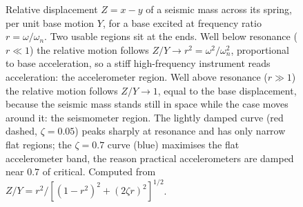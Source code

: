 \begin{figure}[htbp]
\centering
{}
\caption[Seismic-transducer design regions]{Relative displacement
$Z=x-y$ of a seismic mass across its spring, per unit base motion $Y$,
for a base excited at frequency ratio $r=\omega/\omega_n$. Two usable
regions sit at the ends. Well below resonance ($r\ll1$) the relative
motion follows $Z/Y\to r^2=\omega^2/\omega_n^2$, proportional to base
acceleration, so a stiff high-frequency instrument reads acceleration:
the accelerometer region. Well above resonance ($r\gg1$) the relative
motion follows $Z/Y\to1$, equal to the base displacement, because the
seismic mass stands still in space while the case moves around it: the
seismometer region. The lightly damped curve (red dashed, $\zeta=0.05$)
peaks sharply at resonance and has only narrow flat regions; the
$\zeta=0.7$ curve (blue) maximises the flat accelerometer band, the
reason practical accelerometers are damped near $0.7$ of critical.
Computed from $Z/Y=r^2/[(1-r^2)^2+(2\zeta r)^2]^{1/2}$.}
\label{fig:vol03ch06:seismometer}
\end{figure}
